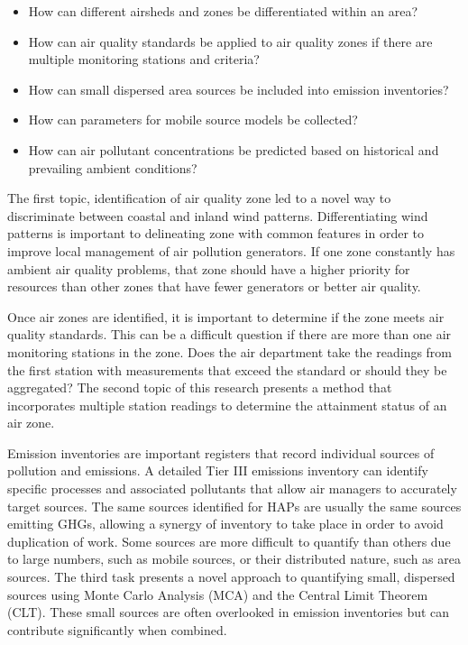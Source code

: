 \begin{itemize}
\item{How can different airsheds and zones be differentiated within an area?}
\item{How can air quality standards be applied to air quality zones if there are multiple monitoring stations and criteria?}
\item{How can small dispersed area sources be included into emission inventories?}
\item{How can parameters for mobile source models be collected?}
\item{How can air pollutant concentrations be predicted based on historical and prevailing ambient conditions?}
\end{itemize}

The first topic, identification of air quality zone led to a novel way to discriminate between coastal and inland wind patterns. Differentiating wind patterns is important to delineating zone with common features in order to improve local management of air pollution generators.  If one zone constantly has ambient air quality problems, that zone should have a higher priority for resources than other zones that have fewer generators or better air quality.

Once air zones are identified, it is important to determine if the zone meets air quality standards. This can be a difficult question if there are more than one air monitoring stations in the zone. Does the air department take the readings from the first station with measurements that exceed the standard or should they be aggregated? The second topic of this research presents a method that incorporates multiple station readings to determine the attainment status of an air zone.  

Emission inventories are important registers that record individual sources of pollution and emissions. A detailed Tier III emissions inventory can identify specific processes and associated pollutants that allow air managers to accurately target sources. The same sources identified for HAPs are usually the same sources emitting GHGs, allowing a synergy of inventory to take place in order to avoid duplication of work. Some sources are more difficult to quantify than others due to large numbers, such as mobile sources, or their distributed nature, such as area sources. The third task presents a novel approach to quantifying small, dispersed sources using Monte Carlo Analysis (MCA) and the Central Limit Theorem (CLT). These small sources are often overlooked in emission inventories but can contribute significantly when combined.

